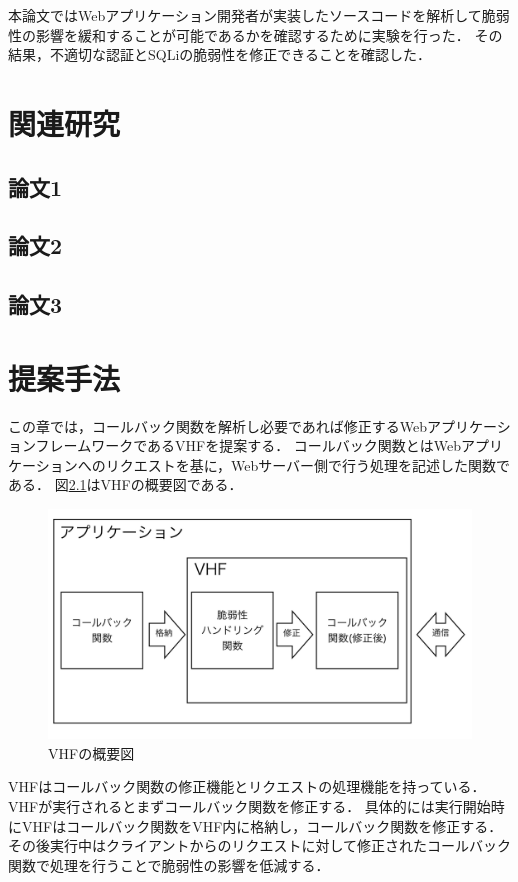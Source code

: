 \documentclass[a4paper,12pt]{jreport}
\begin{document}
本論文ではWebアプリケーション開発者が実装したソースコードを解析して脆弱性の影響を緩和することが可能であるかを確認するために実験を行った．
その結果，不適切な認証とSQLiの脆弱性を修正できることを確認した．

\chapter{関連研究}
\section{論文1}
\section{論文2}
\section{論文3}

\chapter{提案手法}
この章では，コールバック関数を解析し必要であれば修正するWebアプリケーションフレームワークであるVHFを提案する．
コールバック関数とはWebアプリケーションへのリクエストを基に，Webサーバー側で行う処理を記述した関数である．
図\ref{fig:vhf}はVHFの概要図である．
\begin{figure}[ht]
  \begin{center}
    \includegraphics[clip, width=130mm]{./figures/vhf.png}
    \caption{VHFの概要図}
    \label{fig:vhf}
  \end{center}
\end{figure}
VHFはコールバック関数の修正機能とリクエストの処理機能を持っている．
VHFが実行されるとまずコールバック関数を修正する．
具体的には実行開始時にVHFはコールバック関数をVHF内に格納し，コールバック関数を修正する．
その後実行中はクライアントからのリクエストに対して修正されたコールバック関数で処理を行うことで脆弱性の影響を低減する．
\end{document}
